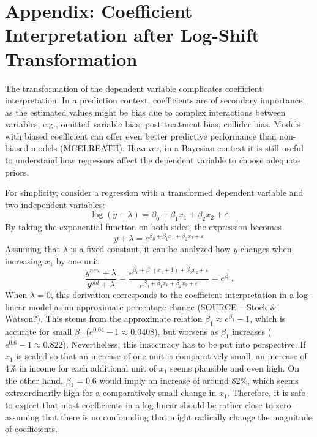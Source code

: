 \chapter{Appendix: Coefficient Interpretation after Log-Shift Transformation}
\label{appendix:coeff}
The transformation of the dependent variable complicates coefficient interpretation.
In a prediction context, coefficients are of secondary importance, as the estimated values might be bias due to complex interactions between variables, e.g., omitted variable bias, post-treatment bias, collider bias.
Models with biased coefficient can offer even better predictive performance than non-biased models (MCELREATH).
However, in a Bayesian context it is still useful to understand how regressors affect the dependent variable to choose adequate priors.

For simplicity, consider a regression with a transformed dependent variable and two independent variables:
\begin{equation*}
    \log(y + \lambda) = \beta_0 + \beta_1 x_1 + \beta_2 x_2 + \varepsilon
\end{equation*}
By taking the exponential function on both sides, the expression becomes
\begin{equation*}
    y + \lambda = e^{\beta_0 + \beta_1 x_1 + \beta_2 x_2 + \varepsilon}
\end{equation*}
Assuming that $\lambda$ is a fixed constant, it can be analyzed how $y$ changes when increasing $x_1$ by one unit
\begin{equation}
    \displaystyle \frac{y^{new} + \lambda}{y^{old} + \lambda} =
    \frac{e^{\beta_0 + \beta_1 (x_1 + 1) + \beta_2 x_2 + \varepsilon}}
    {e^{\beta_0 + \beta_1 x_1 + \beta_2 x_2 + \varepsilon}} = e^{\beta_1}.
\end{equation}
When $\lambda = 0$, this derivation corresponds to the coefficient interpretation in a log-linear model as an approximate percentage change (SOURCE – Stock \& Watson?).
This stems from the approximate relation $\beta_1 \approx e^{\beta_1} - 1$, which is accurate for small $\beta_1$ ($e^{0.04} - 1 \approx 0.0408$), but worsens as $\beta_1$ increases ($e^{0.6} - 1 \approx 0.822$).
Nevertheless, this inaccuracy has to be put into perspective.
If $x_1$ is scaled so that an increase of one unit is comparatively small, an increase of 4\% in income for each additional unit of $x_1$ seems plausible and even high.
On the other hand, $\beta_1 = 0.6$ would imply an increase of around 82\%, which seems extraordinarily high for a comparatively small change in $x_1$.
Therefore, it is safe to expect that most coefficients in a log-linear should be rather close to zero – assuming that there is no confounding that might radically change the magnitude of coefficients.

